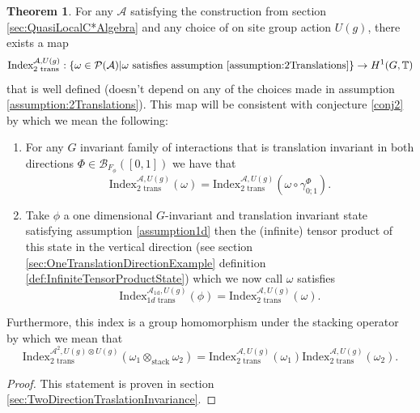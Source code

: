 \documentclass[12pt,a4paper,twoside]{article}
\newcommand{\BB}{\mathcal B}
\newcommand{\PP}{\mathcal P}
\newcommand{\TT}{\mathbb T}
\renewcommand{\AA}{\mathcal A}
\theoremstyle{definition}
\newtheorem{theorem}{Theorem}[section]
\numberwithin{equation}{section}
\begin{document}
\begin{theorem}
	For any $\AA$ satisfying the construction from section \ref{sec:QuasiLocalC*Algebra} and any choice of on site group action $U(g)$, there exists a map
	\begin{equation}
		\textrm{Index}^{\AA,U(g)}_{2\text{ trans}}:\{\omega\in\PP(\AA)| \omega\text{ satisfies assumption \ref{assumption:2Translations}}\}\rightarrow H^1(G,\TT)
	\end{equation}
	that is well defined (doesn't depend on any of the choices made in assumption \ref{assumption:2Translations}). This map will be consistent with conjecture \ref{conj2} by which we mean the following:
	\begin{enumerate}
		\item For any $G$ invariant family of interactions that is translation invariant in both directions $\Phi\in\BB_{F_\phi}([0,1])$ we have that
		\begin{equation}
			\textrm{Index}^{\AA,U(g)}_{2\text{ trans}}(\omega)=\textrm{Index}^{\AA,U(g)}_{2\text{ trans}}(\omega\circ\gamma^\Phi_{0;1}).
		\end{equation}
		\item Take $\phi$ a one dimensional $G$-invariant and translation invariant state satisfying assumption \ref{assumption1d} then the (infinite) tensor product of this state in the vertical direction (see section \ref{sec:OneTranslationDirectionExample} definition \ref{def:InfiniteTensorProductState}) which we now call $\omega$ satisfies
		\begin{equation}
			\textrm{Index}^{\AA_{\text{1d}},U(g)}_{1d\text{ trans}}(\phi)=\text{Index}^{\AA,U(g)}_{2\text{ trans}}(\omega).
		\end{equation}
	\end{enumerate}
	Furthermore, this index is a group homomorphism under the stacking operator by which we mean that
	\begin{equation}
		\textrm{Index}_{\text{2 trans}}^{\AA^2,U(g)\otimes U(g)}(\omega_1\otimes_{\text{stack}}\omega_2)=\textrm{Index}_{\text{2 trans}}^{\AA,U(g)}(\omega_1)\textrm{Index}_{\text{2 trans}}^{\AA,U(g)}(\omega_2).
	\end{equation}
\end{theorem}
\begin{proof}
	This statement is proven in section \ref{sec:TwoDirectionTraslationInvariance}.
\end{proof}
\end{document}
